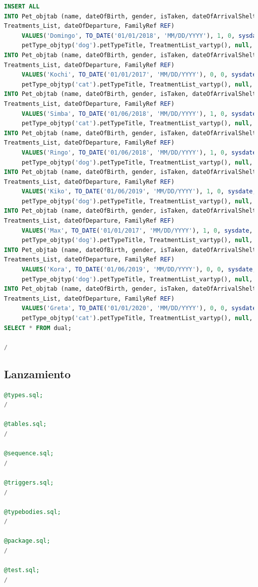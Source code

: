 \documentclass{FR16}
\begin{document}
\begin{lstlisting}[language=Sql, basicstyle=\scriptsize]
INSERT ALL 
INTO Pet_objtab (name, dateOfBirth, gender, isTaken, dateOfArrivalShelter, petType,
Treatments_List, dateOfDeparture, FamilyRef REF)
     VALUES('Domingo', TO_DATE('01/01/2018', 'MM/DD/YYYY'), 1, 0, sysdate, 
     petType_objtyp('dog').petTypeTitle, TreatmentList_vartyp(), null, null)
INTO Pet_objtab (name, dateOfBirth, gender, isTaken, dateOfArrivalShelter, petType,
Treatments_List, dateOfDeparture, FamilyRef REF)
     VALUES('Kochi', TO_DATE('01/01/2017', 'MM/DD/YYYY'), 0, 0, sysdate, 
     petType_objtyp('cat').petTypeTitle, TreatmentList_vartyp(), null, null)
INTO Pet_objtab (name, dateOfBirth, gender, isTaken, dateOfArrivalShelter, petType,
Treatments_List, dateOfDeparture, FamilyRef REF)
     VALUES('Simba', TO_DATE('01/06/2018', 'MM/DD/YYYY'), 1, 0, sysdate, 
     petType_objtyp('cat').petTypeTitle, TreatmentList_vartyp(), null, null)
INTO Pet_objtab (name, dateOfBirth, gender, isTaken, dateOfArrivalShelter, petType,
Treatments_List, dateOfDeparture, FamilyRef REF)
     VALUES('Ringo', TO_DATE('01/06/2018', 'MM/DD/YYYY'), 1, 0, sysdate, 
     petType_objtyp('dog').petTypeTitle, TreatmentList_vartyp(), null, null)
INTO Pet_objtab (name, dateOfBirth, gender, isTaken, dateOfArrivalShelter, petType,
Treatments_List, dateOfDeparture, FamilyRef REF)
     VALUES('Kiko', TO_DATE('01/06/2019', 'MM/DD/YYYY'), 1, 0, sysdate, 
     petType_objtyp('dog').petTypeTitle, TreatmentList_vartyp(), null, null)
INTO Pet_objtab (name, dateOfBirth, gender, isTaken, dateOfArrivalShelter, petType,
Treatments_List, dateOfDeparture, FamilyRef REF)
     VALUES('Max', TO_DATE('01/01/2017', 'MM/DD/YYYY'), 1, 0, sysdate, 
     petType_objtyp('dog').petTypeTitle, TreatmentList_vartyp(), null, null)
INTO Pet_objtab (name, dateOfBirth, gender, isTaken, dateOfArrivalShelter, petType,
Treatments_List, dateOfDeparture, FamilyRef REF)
     VALUES('Kora', TO_DATE('01/06/2019', 'MM/DD/YYYY'), 0, 0, sysdate, 
     petType_objtyp('dog').petTypeTitle, TreatmentList_vartyp(), null, null)
INTO Pet_objtab (name, dateOfBirth, gender, isTaken, dateOfArrivalShelter, petType,
Treatments_List, dateOfDeparture, FamilyRef REF)
     VALUES('Greta', TO_DATE('01/01/2020', 'MM/DD/YYYY'), 0, 0, sysdate, 
     petType_objtyp('cat').petTypeTitle, TreatmentList_vartyp(), null, null)
SELECT * FROM dual;

/
\end{lstlisting}

\subsection{Lanzamiento}
\begin{lstlisting}[language=Sql, basicstyle=\scriptsize]
@types.sql;
/

@tables.sql;
/

@sequence.sql;
/

@triggers.sql;
/

@typebodies.sql;
/

@package.sql;
/

@test.sql;
/

\end{lstlisting}
\newpage
\end{document}
